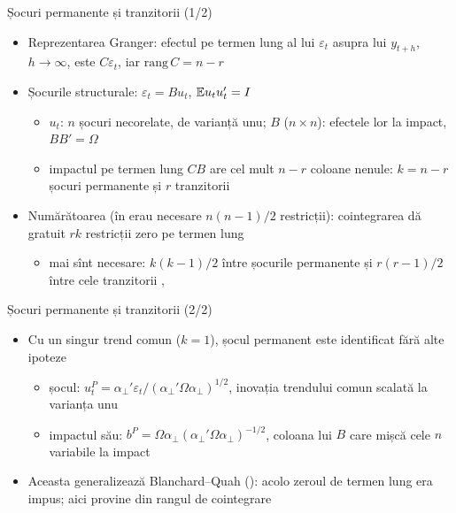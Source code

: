 \begin{frame}{Șocuri permanente și tranzitorii (1/2)}
\itemsize{\small}
\begin{itemize}
    \item Reprezentarea Granger: efectul pe termen lung al lui $\varepsilon_t$ asupra lui $y_{t+h}$, $h \to \infty$, este $C\varepsilon_t$, iar $\mathrm{rang}\,C = n - r$
    \item Șocurile structurale: $\varepsilon_t = Bu_t$, $\mathbb{E} u_tu_t' = I$
    \begin{itemize}
        \item $u_t$: $n$ șocuri necorelate, de varianță unu; $B$ ($n\times n$): efectele lor la impact, $BB' = \Omega$
        \item impactul pe termen lung $CB$ are cel mult $n - r$ coloane nenule: $k = n - r$ șocuri permanente și $r$ tranzitorii
    \end{itemize}
    \item Numărătoarea (în  erau necesare $n(n - 1)/2$ restricții): cointegrarea dă gratuit $rk$ restricții zero pe termen lung
    \begin{itemize}
        \item mai sînt necesare: $k(k - 1)/2$ între șocurile permanente și $r(r - 1)/2$ între cele tranzitorii , 
    \end{itemize}
\end{itemize}
\end{frame}

\begin{frame}{Șocuri permanente și tranzitorii (2/2)}
\itemsize{\small}
\begin{itemize}
    \item Cu un singur trend comun ($k = 1$), șocul permanent este identificat fără alte ipoteze
    \begin{itemize}
        \item șocul: $u_t^P = \alpha_\perp'\varepsilon_t/(\alpha_\perp'\Omega\alpha_\perp)^{1/2}$, inovația trendului comun scalată la varianța unu
        \item impactul său: $b^P = \Omega\alpha_\perp(\alpha_\perp'\Omega\alpha_\perp)^{-1/2}$, coloana lui $B$ care mișcă cele $n$ variabile la impact
    \end{itemize}
    \item Aceasta generalizează Blanchard--Quah (): acolo zeroul de termen lung era impus; aici provine din rangul de cointegrare
\end{itemize}
\end{frame}

